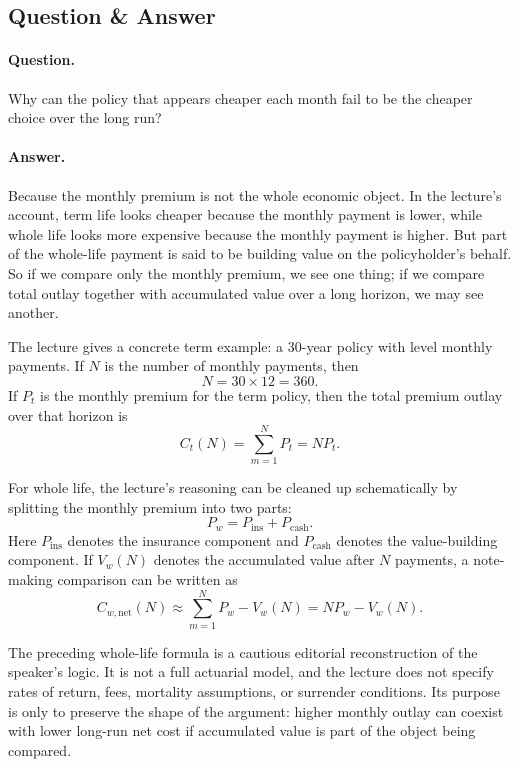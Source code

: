\subsection{Question \& Answer}

\paragraph{Question.} Why can the policy that appears cheaper each month fail to be the cheaper choice over the long run?

\paragraph{Answer.} Because the monthly premium is not the whole economic object. In the lecture's account, term life looks cheaper because the monthly payment is lower, while whole life looks more expensive because the monthly payment is higher. But part of the whole-life payment is said to be building value on the policyholder's behalf. So if we compare only the monthly premium, we see one thing; if we compare total outlay together with accumulated value over a long horizon, we may see another.

The lecture gives a concrete term example: a 30-year policy with level monthly payments. If \(N\) is the number of monthly payments, then
\begin{equation}
N = 30 \times 12 = 360.
\end{equation}
If \(P_t\) is the monthly premium for the term policy, then the total premium outlay over that horizon is
\begin{equation}
C_t(N) = \sum_{m=1}^{N} P_t = N P_t.
\end{equation}

For whole life, the lecture's reasoning can be cleaned up schematically by splitting the monthly premium into two parts:
\begin{equation}
P_w = P_{\mathrm{ins}} + P_{\mathrm{cash}}.
\end{equation}
Here \(P_{\mathrm{ins}}\) denotes the insurance component and \(P_{\mathrm{cash}}\) denotes the value-building component. If \(V_w(N)\) denotes the accumulated value after \(N\) payments, a note-making comparison can be written as
\begin{equation}
C_{w,\mathrm{net}}(N) \approx \sum_{m=1}^{N} P_w - V_w(N) = N P_w - V_w(N).
\end{equation}

\begin{remark}
The preceding whole-life formula is a cautious editorial reconstruction of the speaker's logic. It is not a full actuarial model, and the lecture does not specify rates of return, fees, mortality assumptions, or surrender conditions. Its purpose is only to preserve the shape of the argument: higher monthly outlay can coexist with lower long-run net cost if accumulated value is part of the object being compared.
\end{remark}

